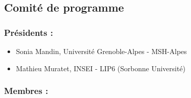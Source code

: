 \subsection*{Comité de programme}

\subsubsection*{Présidents :}

\begin{itemize}
	\item[] Sonia Mandin, Université Grenoble-Alpes - MSH-Alpes
	\item[] Mathieu Muratet, INSEI - LIP6 (Sorbonne Université)
\end{itemize}

\subsubsection*{Membres :}


